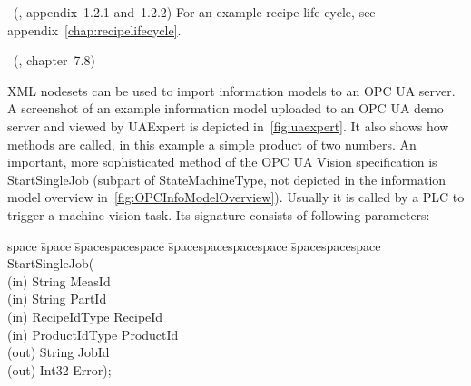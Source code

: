 ~(\cite{OPC-Foundation2018OPC1.04}, appendix~1.2.1 and~1.2.2) For an example recipe life cycle, see appendix~\ref{chap:recipelifecycle}.

~(\cite{OPC-Foundation2018OPC1.04}, chapter~7.8)

XML nodesets can be used to import information models to an OPC UA server. A screenshot of an example information model uploaded to an OPC UA demo server and viewed by UAExpert is depicted in~\ref{fig:uaexpert}. It also shows how methods are called, in this example a simple product of two numbers. An important, more sophisticated method of the OPC UA Vision specification is StartSingleJob (subpart of StateMachineType, not depicted in the information model overview in~\ref{fig:OPCInfoModelOverview}). Usually it is called by a PLC to trigger a machine vision task. Its signature consists of following parameters:

\begin{minipage}{\linewidth}
\begin{tabbing}
    space \= space \= spacespacespace \= spacespacespacespace \= spacespacespace \kill
    \>  StartSingleJob(\\
    \>  \>  (in)	 \> 	String          \> MeasId\\
    \>  \>  (in)	 \> 	String          \> PartId\\
    \>  \>  (in)	 \> 	RecipeIdType    \> RecipeId\\
    \>  \>  (in)	 \> 	ProductIdType   \> ProductId\\
    \>  \>  (out)	 \> 	String          \> JobId\\
    \>  \>  (out)	 \> 	Int32           \> Error); 
\end{tabbing}
\end{minipage}

